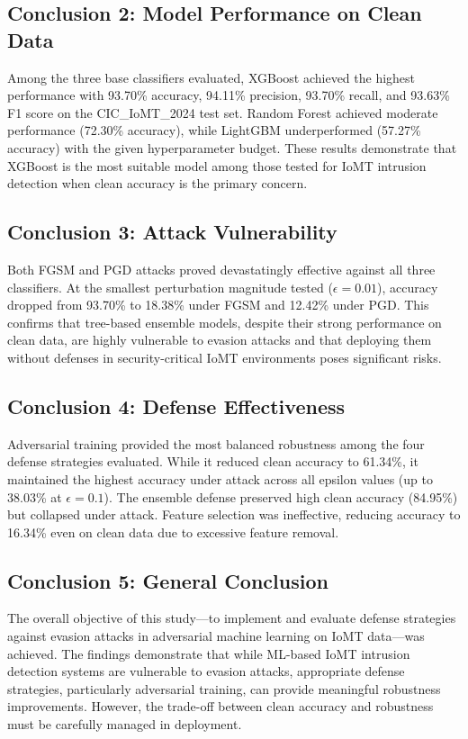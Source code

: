 \documentclass[12pt,a4paper,oneside]{report}
\begin{document}
\subsection{Conclusion 2: Model Performance on Clean Data}

Among the three base classifiers evaluated, XGBoost achieved the highest performance with 93.70\% accuracy, 94.11\% precision, 93.70\% recall, and 93.63\% F1 score on the CIC\_IoMT\_2024 test set. Random Forest achieved moderate performance (72.30\% accuracy), while LightGBM underperformed (57.27\% accuracy) with the given hyperparameter budget. These results demonstrate that XGBoost is the most suitable model among those tested for IoMT intrusion detection when clean accuracy is the primary concern.

\subsection{Conclusion 3: Attack Vulnerability}

Both FGSM and PGD attacks proved devastatingly effective against all three classifiers. At the smallest perturbation magnitude tested ($\epsilon = 0.01$), accuracy dropped from 93.70\% to 18.38\% under FGSM and 12.42\% under PGD. This confirms that tree-based ensemble models, despite their strong performance on clean data, are highly vulnerable to evasion attacks and that deploying them without defenses in security-critical IoMT environments poses significant risks.

\subsection{Conclusion 4: Defense Effectiveness}

Adversarial training provided the most balanced robustness among the four defense strategies evaluated. While it reduced clean accuracy to 61.34\%, it maintained the highest accuracy under attack across all epsilon values (up to 38.03\% at $\epsilon = 0.1$). The ensemble defense preserved high clean accuracy (84.95\%) but collapsed under attack. Feature selection was ineffective, reducing accuracy to 16.34\% even on clean data due to excessive feature removal.

\subsection{Conclusion 5: General Conclusion}

The overall objective of this study---to implement and evaluate defense strategies against evasion attacks in adversarial machine learning on IoMT data---was achieved. The findings demonstrate that while ML-based IoMT intrusion detection systems are vulnerable to evasion attacks, appropriate defense strategies, particularly adversarial training, can provide meaningful robustness improvements. However, the trade-off between clean accuracy and robustness must be carefully managed in deployment.
\end{document}

